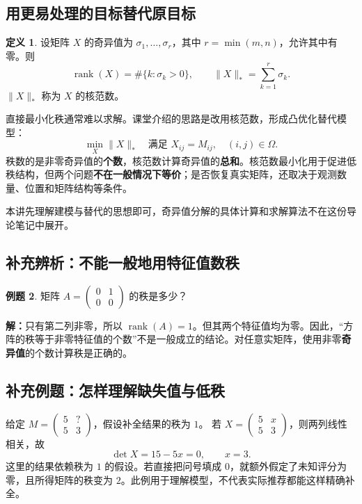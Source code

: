 \documentclass[UTF8,fontset=fandol,a4paper,12pt]{ctexart}
\theoremstyle{definition}
\newtheorem{definition}{定义}[section]
\newtheorem{example}[definition]{例题}
\begin{document}
\subsection{用更易处理的目标替代原目标}
\begin{definition}
设矩阵 $X$ 的奇异值为 $\sigma_1,\ldots,\sigma_r$，其中 $r=\min(m,n)$，允许其中有零。则
\[
\operatorname{rank}(X)=\#\{k:\sigma_k>0\},\qquad
\|X\|_*=\sum_{k=1}^{r}\sigma_k.
\]
$\|X\|_*$ 称为 $X$ 的核范数。
\end{definition}
直接最小化秩通常难以求解。课堂介绍的思路是改用核范数，形成凸优化替代模型：
\[
\boxed{\min_X\|X\|_*\quad
\text{满足 }X_{ij}=M_{ij},\quad(i,j)\in\Omega.}
\]
秩数的是非零奇异值的\textbf{个数}，核范数计算奇异值的\textbf{总和}。核范数最小化用于促进低秩结构，但两个问题\textbf{不在一般情况下等价}；是否恢复真实矩阵，还取决于观测数量、位置和矩阵结构等条件。

本讲先理解建模与替代的思想即可，奇异值分解的具体计算和求解算法不在这份导论笔记中展开。

\subsection{补充辨析：不能一般地用特征值数秩}
\begin{example}
矩阵 $A=\begin{pmatrix}0&1\\0&0\end{pmatrix}$ 的秩是多少？
\end{example}
\noindent\textbf{解：}只有第二列非零，所以 $\operatorname{rank}(A)=1$。但其两个特征值均为零。因此，“方阵的秩等于非零特征值的个数”不是一般成立的结论。对任意实矩阵，使用非零\textbf{奇异值}的个数计算秩是正确的。

\subsection{补充例题：怎样理解缺失值与低秩}
给定 $M=\begin{pmatrix}5&?\\5&3\end{pmatrix}$，假设补全结果的秩为 $1$。
若 $X=\begin{pmatrix}5&x\\5&3\end{pmatrix}$，则两列线性相关，故
\[
\det X=15-5x=0,\qquad x=3.
\]
这里的结果依赖秩为 $1$ 的假设。若直接把问号填成 $0$，就额外假定了未知评分为零，且所得矩阵的秩变为 $2$。此例用于理解模型，不代表实际推荐都能这样精确补全。

\newpage
\end{document}
